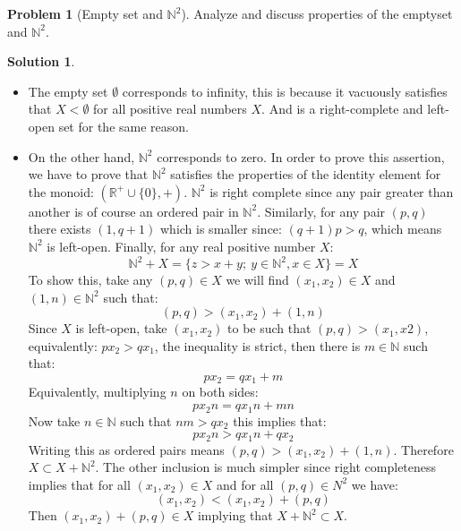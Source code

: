 \documentclass{article}
\theoremstyle{definition}
\newtheorem*{soln}{Solution}
\newtheorem*{prob}{Problem}
\theoremstyle{theorem}
\newcommand{\R}{\mathbb{R}}
\newcommand{\N}{\mathbb{N}}
\begin{document}
\begin{prob}[Empty set and $\N^2$]
Analyze and discuss properties of the emptyset and $\N^2$.
\end{prob}
\begin{soln}
	\begin{itemize}
		\item The empty set $\emptyset$ corresponds to infinity, this is because it vacuously satisfies that $X< \emptyset$ for all positive real numbers $X$. And is a right-complete and left-open set  for the same reason.
		\item On the other hand, $\N^2$ corresponds to zero. In order to prove this assertion, we have to prove that $\N^2$ satisfies the properties of the identity element for the monoid: $(\R^+\cup\{0\},+)$. $\N^2$ is right complete since any pair greater than another is of course an ordered pair in $\N^2$. Similarly, for any pair $(p,q)$ there exists $(1,q+1)$ which is smaller since: $(q+1)p > q$, which means $\N^2$ is left-open. Finally, for any real positive number $X$:
			$$\N^2 + X = \{z > x+y;\  y\in \N^2 , x\in X\} = X$$
			To show this, take any $(p,q)\in X$ we will find $(x_1,x_2)\in X$ and $(1,n)\in \N^2$ such that:
			$$(p,q) > (x_1,x_2)+ (1,n)$$
			Since $X$ is left-open, take $(x_1, x_2)$ to be such that $(p,q)>(x_1,x2)$, equivalently: $px_2> qx_1$, the inequality is strict, then there is $m\in \N$ such that:
			$$px_2 = qx_1 + m$$
			Equivalently, multiplying $n$ on both sides:
			$$px_2n = qx_1n + mn$$
Now take $n\in \N$ such that $nm>qx_2$ this implies that:
$$ px_2n > qx_1n + qx_2$$
			Writing this as ordered pairs means $(p,q) > (x_1,x_2)+(1,n)$. Therefore $X\subset X+\N^2$. The other inclusion is much simpler since right completeness implies that for all $(x_1,x_2)\in X$ and for all $(p,q)\in N^2$ we have:
			$$(x_1,x_2)<(x_1,x_2) + (p,q)$$
			Then $(x_1,x_2) + (p,q) \in X$ implying that $X+\N^2 \subset X$.
	\end{itemize}
\end{soln}
\vspace{1in}
\end{document}
